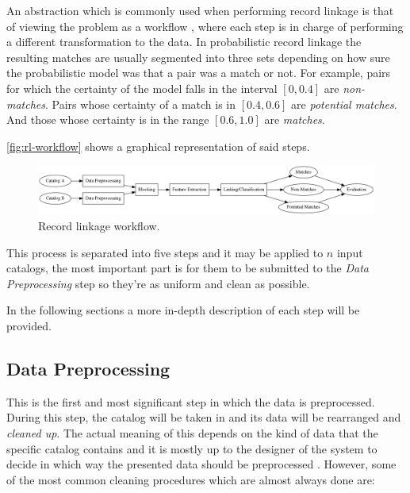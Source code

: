 \documentclass[epsfig,a4paper,11pt,titlepage,twoside,openany]{book}
\begin{document}
An abstraction which is commonly used when performing record linkage is that of viewing the problem as a workflow \cite{christen12_data}, where each step is in charge of performing a different transformation to the data. In probabilistic record linkage \cite{fellegi69_theor_recor_linkag} the resulting matches are usually segmented into three sets depending on how sure the probabilistic model was that a pair was a match or not. For example, pairs for which the certainty of the model falls in the interval $[0, 0.4]$ are \textit{non-matches}. Pairs whose certainty of a match is in $[0.4, 0.6]$ are \textit{potential matches}. And those whose certainty is in the range $[0.6, 1.0]$ are \textit{matches}.

\autoref{fig:rl-workflow} shows a graphical representation of said steps.

\begin{figure}[H]
  \centering \includegraphics[width=\textwidth]{rl-workflow}
  \caption{Record linkage workflow.}
  \label{fig:rl-workflow}
\end{figure}

This process is separated into five steps and it may be applied to $n$ input catalogs, the most important part is for them to be submitted to the \textit{Data Preprocessing} step so they're as uniform and clean as possible. 



In the following sections a more in-depth description of each step will be provided.


\subsection{Data Preprocessing}
\label{sec:rl-workflow-data-preprocessing}

This is the first and most significant step in which the data is preprocessed. During this step, the catalog will be taken in and its data will be rearranged and \textit{cleaned up}. The actual meaning of this depends on the kind of data that the specific catalog
contains and it is mostly up to the designer of the system to decide in which way the presented data
should be preprocessed \cite{Rahm00datacleaning}. 
However, some of the most common cleaning procedures which are almost always done are:
\end{document}
